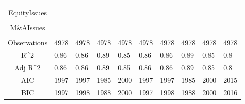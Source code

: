 \documentclass{article}
\begin{document}
\begin{table}[H]
\begin{tabular}{|clllllllll|}
   &  &  &  &  &  &  &  &  &  \\ 
  EquityIssues &  &  &  &  &  &  &  &  &  \\ 
   &  &  &  &  &  &  &  &  &  \\ 
  M\&AIssues &  &  &  &  &  &  &  &  &  \\ 
   &  &  &  &  &  &  &  &  &  \\ 
  \hline 
 Observations & 4978 & 4978 & 4978 & 4978 & 4978 & 4978 & 4978 & 4978 & 4978 \\ 
  R^2 & 0.86 & 0.86 & 0.89 & 0.85 & 0.86 & 0.86 & 0.89 & 0.85 & 0.8 \\ 
  Adj R^2 & 0.86 & 0.86 & 0.89 & 0.85 & 0.86 & 0.86 & 0.89 & 0.85 & 0.8 \\ 
  AIC & 1997 & 1997 & 1985 & 2000 & 1997 & 1997 & 1985 & 2000 & 2015 \\ 
  BIC & 1997 & 1998 & 1988 & 2000 & 1997 & 1998 & 1988 & 2000 & 2016 \\ 
   \hline
\end{tabular}
 
\end{table}
\end{document}
